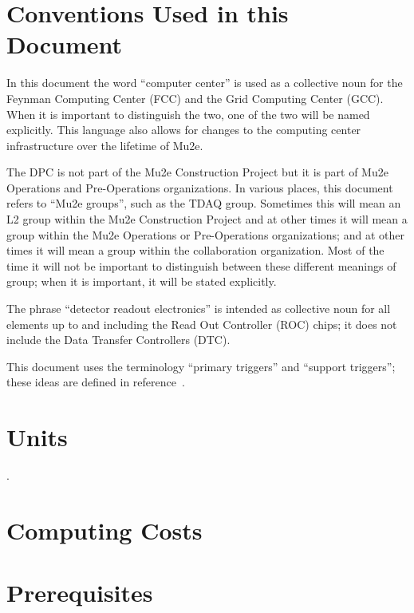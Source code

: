 \section{Conventions Used in this Document}
\label{sec:conventions}

In this document the word ``computer center'' is used as a collective noun for the
Feynman Computing Center (FCC) and the Grid Computing Center (GCC).
When it is important to distinguish the two, one of the two will be named explicitly.
This language also allows for changes to the computing center infrastructure over the
lifetime of Mu2e.

The DPC is not part of the Mu2e Construction Project but it is part of Mu2e Operations
and Pre-Operations organizations.
In various places, this document refers to ``Mu2e groups'', such as the TDAQ group.
Sometimes this will mean an L2 group within the Mu2e Construction Project and at other
times it will mean a group within the Mu2e Operations or Pre-Operations organizations;
and at other times it will mean a group within the collaboration organization.
Most of the time it will not be important to distinguish between these different meanings
of group; when it is important, it will be stated explicitly.

The phrase ``detector readout electronics'' is intended as collective noun for all elements
up to and including the Read Out Controller (ROC) chips; it does not include
the Data Transfer Controllers (DTC).

This document uses the terminology ``primary triggers'' and ``support triggers'';
these ideas are defined in reference~\cite{TriggerSU2020}.

\section{Units}
\label{sec:units}

.

\section{Computing Costs}


\section{Prerequisites}
\label{sec:prerequisites}


